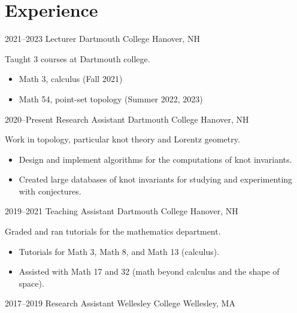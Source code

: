 \documentclass[a4paper,sans]{moderncv}
\begin{document}
    \section{Experience}
        \cventry%
            {2021--2023}
            {Lecturer}
            {Dartmouth College}
            {Hanover, NH}
            {}
            {%
                Taught 3 courses at Dartmouth college.
                \begin{itemize}
                    \item Math 3, calculus (Fall 2021)
                    \item Math 54, point-set topology (Summer 2022, 2023)
                \end{itemize}
            }
        \cventry%
            {2020--Present}
            {Research Assistant}
            {Dartmouth College}
            {Hanover, NH}
            {}
            {%
                Work in topology, particular knot theory and Lorentz geometry.
                \begin{itemize}
                    \item
                        Design and implement algorithms for the computations of
                        knot invariants.
                    \item
                        Created large databases of knot invariants for studying
                        and experimenting with conjectures.
                \end{itemize}%
             }
        \cventry%
            {2019--2021}
            {Teaching Assistant}
            {Dartmouth College}
            {Hanover, NH}
            {}
            {%
                Graded and ran tutorials for the mathematics department.
                \begin{itemize}
                    \item
                        Tutorials for Math 3, Math 8, and Math 13 (calculus).
                    \item
                        Assisted with Math 17 and 32 (math beyond calculus and
                        the shape of space).
                \end{itemize}
            }
        \cventry%
            {2017--2019}
            {Research Assistant}
            {Wellesley College}
            {Wellesley, MA}
            {}
\end{document}
